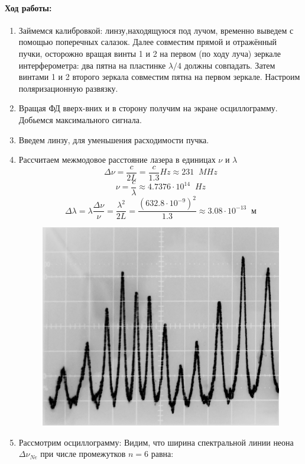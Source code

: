 \documentclass[a4paper,12pt]{article}
\begin{document}
\paragraph{Ход работы:}
\begin{enumerate}
\itemsep0em
\item Займемся калибровкой: линзу,находящуюся под лучом, временно выведем с помощью поперечных салазок. Далее совместим прямой и отражённый пучки, осторожно вращая винты 1
и 2 на первом (по ходу луча) зеркале интерферометра: два пятна на
пластинке $\lambda/4$ должны совпадать. Затем винтами 1 и 2 второго зеркала
совместим пятна на первом зеркале. Настроим поляризационную развязку.
\item Вращая ФД вверх-вних и в сторону получим на экране осциллограмму. Добьемся максимального сигнала.
\item Введем линзу, для уменьшения расходимости пучка.
\item Рассчитаем межмодовое расстояние лазера в единицах $\nu$ и $\lambda$
\[\Delta \nu =\frac{c}{2L}=\frac{c}{1.3}Hz\approx 231\;\;MHz\]
\[\nu = \frac{c}{\lambda}\approx 4.7376 \cdot 10^{14}\;\; Hz\]
\[\Delta \lambda = \lambda\frac{\Delta\nu}{\nu}=\frac{\lambda^2}{2L}=\frac{(632.8 \cdot 10^{-9})^2}{1.3}\approx 3.08 \cdot 10^{-13}\;\;\text{м}\]
\begin{figure}[h!]
\includegraphics[scale=0.15]{wave.png} 
\centering
\end{figure}
\item Рассмотрим осциллограмму: Видим, что ширина спектральной линии неона $\Delta \nu_{Ne}$ при числе промежутков $n=6$ равна:

\end{enumerate}
\end{document}
